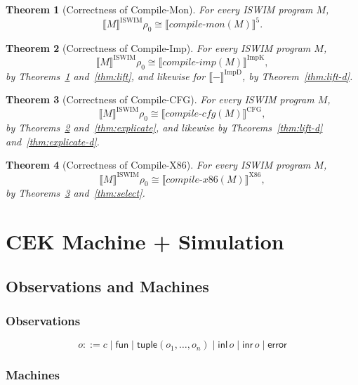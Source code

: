 \documentclass[10pt]{article}
\theoremstyle{acmplain}
\newtheorem{theorem}{Theorem}[section]
\newcommand{\SEM}[1]{\llbracket #1 \rrbracket}
\newcommand{\key}[1]{\mathsf{#1}}
\newcommand{\pass}[1]{\mathit{#1}}
\newcommand{\inl}{\key{inl}\,}
\newcommand{\inr}{\key{inr}\,}
\newcommand{\obseq}{\cong}
\newcommand{\error}{\key{error}}
\begin{document}
\begin{theorem}[Correctness of Compile-Mon]\label{thm:compile-mon}
For every ISWIM program $M$,
\[
  \SEM{M}^{\mathrm{ISWIM}}\rho_0 \obseq \SEM{\pass{compile\text{-}mon}(M)}^{\mathrm{5}} .
\]
\end{theorem}

\begin{theorem}[Correctness of Compile-Imp]\label{thm:compile-imp}
For every ISWIM program $M$,
\[
  \SEM{M}^{\mathrm{ISWIM}}\rho_0 \obseq \SEM{\pass{compile\text{-}imp}(M)}^{\mathrm{ImpK}} ,
\]
by Theorems~\ref{thm:compile-mon} and~\ref{thm:lift}, and likewise for
$\SEM{-}^{\mathrm{ImpD}}$, by Theorem~\ref{thm:lift-d}.
\end{theorem}

\begin{theorem}[Correctness of Compile-CFG]\label{thm:compile-cfg}
For every ISWIM program $M$,
\[
  \SEM{M}^{\mathrm{ISWIM}}\rho_0 \obseq \SEM{\pass{compile\text{-}cfg}(M)}^{\mathrm{CFG}} ,
\]
by Theorems~\ref{thm:compile-imp} and~\ref{thm:explicate}, and likewise
by Theorems~\ref{thm:lift-d} and~\ref{thm:explicate-d}.
\end{theorem}

\begin{theorem}[Correctness of Compile-X86]\label{thm:compile-x86}
For every ISWIM program $M$,
\[
  \SEM{M}^{\mathrm{ISWIM}}\rho_0 \obseq \SEM{\pass{compile\text{-}x86}(M)}^{\mathrm{X86}} ,
\]
by Theorems~\ref{thm:compile-cfg} and~\ref{thm:select}.
\end{theorem}

\section{CEK Machine + Simulation}\label{sec:u-cek}

\subsection{Observations and Machines}

\subsubsection{Observations}\label{sec:obs}

\[
  o ::= c \mid \key{fun} \mid \key{tuple}(o_1, \ldots, o_n) \mid \inl o \mid \inr o \mid \error
\]

\subsubsection{Machines}
\end{document}
